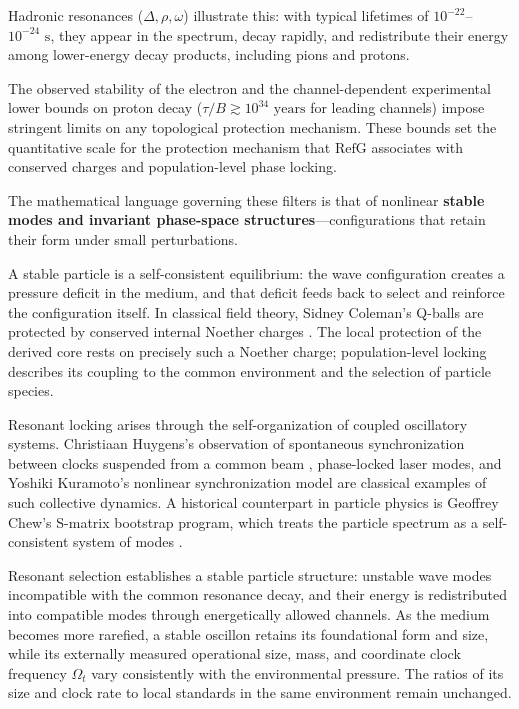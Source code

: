 \documentclass[11pt,a4paper]{article}
\newcommand{\RefG}{\mathrm{RefG}}
\begin{document}
Hadronic resonances ($\Delta, \rho, \omega$) illustrate this: with typical lifetimes of $10^{-22}$--$10^{-24}\text{ s}$, they appear in the spectrum, decay rapidly, and redistribute their energy among lower-energy decay products, including pions and protons.

The observed stability of the electron and the channel-dependent experimental lower bounds on proton decay ($\tau/B\gtrsim10^{34}\text{ years}$ for leading channels) impose stringent limits on any topological protection mechanism. These bounds set the quantitative scale for the protection mechanism that $\RefG$ associates with conserved charges and population-level phase locking.

The mathematical language governing these filters is that of nonlinear \textbf{stable modes and invariant phase-space structures}---configurations that retain their form under small perturbations.

A stable particle is a self-consistent equilibrium: the wave configuration creates a pressure deficit in the medium, and that deficit feeds back to select and reinforce the configuration itself. In classical field theory, Sidney Coleman's Q-balls are protected by conserved internal Noether charges \citep{coleman1985}. The local protection of the derived core rests on precisely such a Noether charge; population-level locking describes its coupling to the common environment and the selection of particle species.

Resonant locking arises through the self-organization of coupled oscillatory systems. Christiaan Huygens's observation of spontaneous synchronization between clocks suspended from a common beam \citep{huygens1665}, phase-locked laser modes, and Yoshiki Kuramoto's nonlinear synchronization model \citep{kuramoto1975} are classical examples of such collective dynamics. A historical counterpart in particle physics is Geoffrey Chew's S-matrix bootstrap program, which treats the particle spectrum as a self-consistent system of modes \citep{chew1961}.

Resonant selection establishes a stable particle structure: unstable wave modes incompatible with the common resonance decay, and their energy is redistributed into compatible modes through energetically allowed channels. As the medium becomes more rarefied, a stable oscillon retains its foundational form and size, while its externally measured operational size, mass, and coordinate clock frequency $\Omega_t$ vary consistently with the environmental pressure. The ratios of its size and clock rate to local standards in the same environment remain unchanged.
\end{document}

